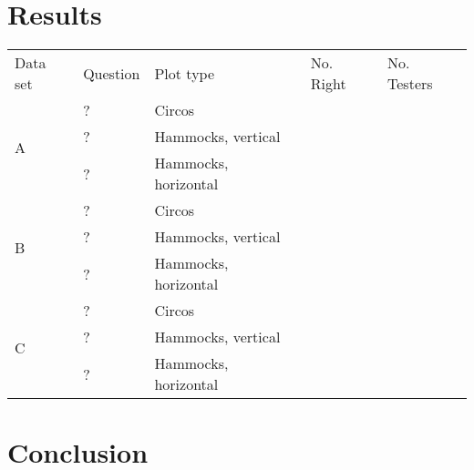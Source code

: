 \documentclass{vgtc}                          %
\begin{document}
\section{Results}
\begin{table}[h]
\begin{tabular}{p{.5cm}p{2cm}lp{.6cm}p{.75cm}}
Data set & Question & Plot type & No. Right & No. Testers\\
\multirow{3}{*}{A} & ? & Circos & & \\
 & ? & Hammocks, vertical & & \\
 & ? & Hammocks, horizontal & & \\ 
\hline
\multirow{3}{*}{B} & ? & Circos & & \\
 & ? & Hammocks, vertical & & \\
 & ? & Hammocks, horizontal & & \\ 
\hline
\multirow{3}{*}{C} & ? & Circos & & \\
 & ? & Hammocks, vertical & & \\
 & ? & Hammocks, horizontal & & \\ 
\end{tabular}

\end{table}
\section{Conclusion}



\nocite{*}

\end{document}
